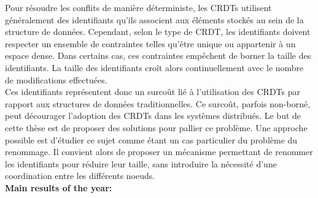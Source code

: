 \documentclass[12pt]{article}
\newcommand{\commentaire}[1]{}
\begin{document}
Pour résoudre les conflits de manière déterministe, les \acp{CRDT} utilisent généralement des identifiants qu'ils associent aux éléments stockés au sein de la structure de données.
Cependant, selon le type de \ac{CRDT}, les identifiants doivent respecter un ensemble de contraintes telles qu'être unique ou appartenir à un espace dense.
Dans certains cas, ces contraintes empêchent de borner la taille des identifiants.
La taille des identifiants croît alors continuellement avec le nombre de modifications effectuées.
\\

Ces identifiants représentent donc un surcoût lié à l'utilisation des \acp{CRDT} par rapport aux structures de données traditionnelles.
Ce surcoût, parfois non-borné, peut décourager l'adoption des \acp{CRDT} dans les systèmes distribués.
Le but de cette thèse est de proposer des solutions pour pallier ce problème.
Une approche possible est d'étudier ce sujet comme étant un cas particulier du problème du renommage.
Il convient alors de proposer un mécanisme permettant de renommer les identifiants pour réduire leur taille, sans introduire la nécessité d'une coordination entre les différents noeuds.
\\

\noindent\textbf{Main results of the year:}
\commentaire{%
  studies and works achieved, results obtained with respect to the
  objectives of the thesis; difficulties encountered}
\end{document}
